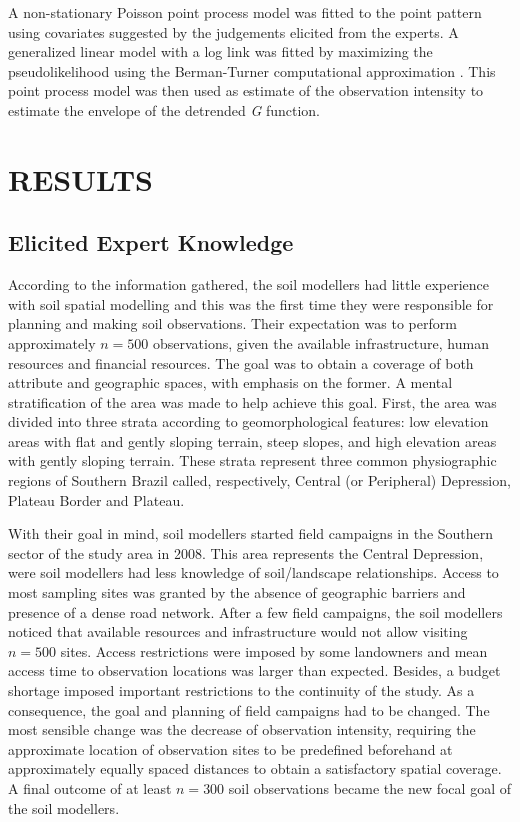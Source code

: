 A non-stationary Poisson point process model was fitted to the point pattern using covariates suggested by the 
judgements elicited from the experts. A generalized linear model with a log link was fitted by maximizing the 
pseudolikelihood using the Berman-Turner computational approximation \cite{Baddeley2010}. This point process 
model was then used as estimate of the observation intensity to estimate the envelope of the detrended \emph{G} 
function.

\section{RESULTS}

\subsection{Elicited Expert Knowledge}
\label{sec:chap07-elicited}

According to the information gathered, the soil modellers had little experience with soil spatial 
modelling and this was the first time they were responsible for planning and making soil observations. Their 
expectation was to perform approximately $n = 500$ observations, given the available infrastructure, human 
resources and financial resources. The goal was to obtain a  coverage of both attribute and 
geographic spaces, with emphasis on the former. A mental stratification of the area was made to help achieve 
this goal. First, the area was divided into three strata according to geomorphological features: low elevation 
areas with flat and gently sloping terrain, steep slopes, and high elevation areas with gently sloping 
terrain. These strata represent three common physiographic regions of Southern Brazil called, respectively, 
Central (or Peripheral) Depression, Plateau Border and Plateau.

With their goal in mind, soil modellers started field campaigns in the Southern sector of the study area in 
\num{2008}. This area represents the Central Depression, were soil modellers had less knowledge of 
soil\-/landscape relationships. Access to most sampling sites was granted by the absence of geographic 
barriers and presence of a dense road network. After a few field campaigns, the soil modellers noticed that 
available resources and infrastructure would not allow visiting $n = 500$ sites. Access restrictions were 
imposed by some landowners and mean access time to observation locations was larger than expected. Besides, a 
budget shortage imposed important restrictions to the continuity of the study. As a consequence, the goal and 
planning of field campaigns had to be changed. The most sensible change was the decrease of observation 
intensity, requiring the approximate location of observation sites to be predefined beforehand at 
approximately equally spaced distances to obtain a satisfactory spatial coverage. A final outcome of at least 
$n = 300$ soil observations became the new focal goal of the soil modellers.

